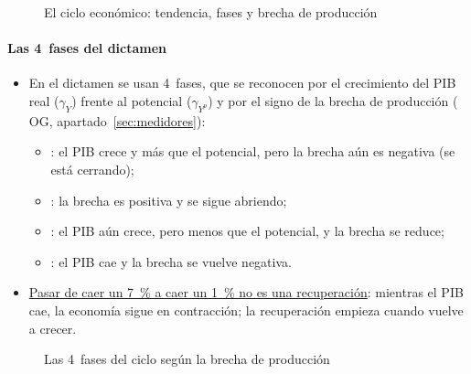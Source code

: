 \documentclass[11pt]{article}
\begin{document}
\begin{figure}[!htb]
\centering
\caption{El ciclo económico: tendencia, fases y brecha de producción}\label{fig:ciclo-tendencia}
\end{figure}

\paragraph{Las 4~fases del dictamen}
\begin{itemize}
\item En el dictamen se usan 4~fases, que se reconocen por el crecimiento del PIB real ($\gamma_Y$) frente al potencial ($\gamma_{Y^p}$) y por el signo de la brecha de producción ($\mathrm{OG}$, apartado~\ref{sec:medidores}):
  \begin{itemize}
  \item {}: el PIB crece y más que el potencial, pero la brecha aún es negativa (se está cerrando);
  \item {}: la brecha es positiva y se sigue abriendo;
  \item {}: el PIB aún crece, pero menos que el potencial, y la brecha se reduce;
  \item {}: el PIB cae y la brecha se vuelve negativa.
  \end{itemize}
\item \uline{Pasar de caer un 7~\% a caer un 1~\% no es una recuperación}: mientras el PIB cae, la economía sigue en contracción; la recuperación empieza cuando vuelve a crecer.
\end{itemize}

\begin{figure}[!htb]
\centering
\caption{Las 4~fases del ciclo según la brecha de producción}\label{fig:fases-ciclo}
\end{figure}
\end{document}
